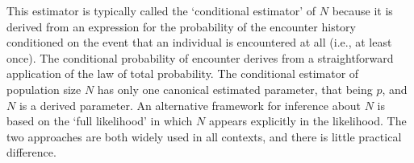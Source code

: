 \documentclass{book}
\begin{document}

This estimator is typically called the `conditional estimator' of $N$
because it is derived from an expression for the probability of the
encounter history conditioned on the event that an individual is
encountered at all (i.e., at least once).  The conditional probability
of encounter derives from a straightforward application of the law of
total probability.  The conditional estimator of population size $N$
has only one canonical estimated parameter, that being $p$, and $N$ is
a derived parameter. An alternative framework for inference about $N$
is based on the `full likelihood' in which $N$ appears explicitly in
the likelihood.  The two approaches are both widely used in all
contexts, and there is little practical difference.

\end{document}
